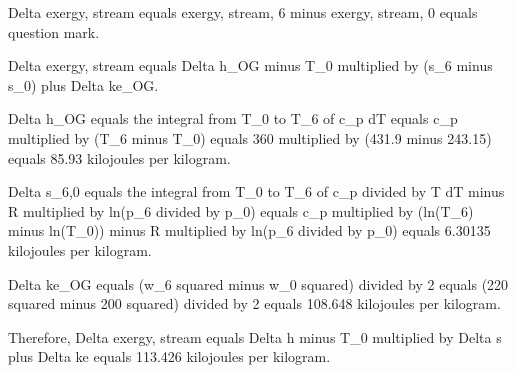 Delta exergy, stream equals exergy, stream, 6 minus exergy, stream, 0 equals question mark.  

Delta exergy, stream equals Delta h_OG minus T_0 multiplied by (s_6 minus s_0) plus Delta ke_OG.  

Delta h_OG equals the integral from T_0 to T_6 of c_p dT equals c_p multiplied by (T_6 minus T_0) equals 360 multiplied by (431.9 minus 243.15) equals 85.93 kilojoules per kilogram.  

Delta s_6,0 equals the integral from T_0 to T_6 of c_p divided by T dT minus R multiplied by ln(p_6 divided by p_0) equals c_p multiplied by (ln(T_6) minus ln(T_0)) minus R multiplied by ln(p_6 divided by p_0) equals 6.30135 kilojoules per kilogram.  

Delta ke_OG equals (w_6 squared minus w_0 squared) divided by 2 equals (220 squared minus 200 squared) divided by 2 equals 108.648 kilojoules per kilogram.  

Therefore, Delta exergy, stream equals Delta h minus T_0 multiplied by Delta s plus Delta ke equals 113.426 kilojoules per kilogram.